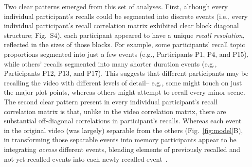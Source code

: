 \documentclass{article}
\newcommand{\corrmats}{S4}
\begin{document}
Two clear patterns emerged from this set of analyses.  First, although every individual participant's recalls could be segmented into discrete events (i.e., every individual participant's recall correlation matrix exhibited clear block diagonal structure; Fig.~\corrmats), each participant appeared to have a unique \textit{recall resolution}, reflected in the sizes of those blocks.  For example, some participants' recall topic proportions segmented into just a few events (e.g., Participants P1, P4, and P15), while others' recalls segmented into many shorter duration events (e.g., Participants P12, P13, and P17).  This suggests that different participants may be recalling the video with different levels of detail-- e.g., some might touch on just the major plot points, whereas others might attempt to recall every minor scene.  The second clear pattern present in every individual participant's recall correlation matrix is that, unlike in the video correlation matrix, there are substantial off-diagonal correlations in participant's recalls.  Whereas each event in the original video (was largely) separable from the others (Fig.~\ref{fig:model}B), in transforming those separable events into memory participants appear to be integrating \textit{across} different events, blending elements of previously recalled and not-yet-recalled events into each newly recalled event~\citep[Figs.~\ref{fig:model}D, \corrmats; also see][]{MannEtal11, HowaEtal12}.
\end{document}
